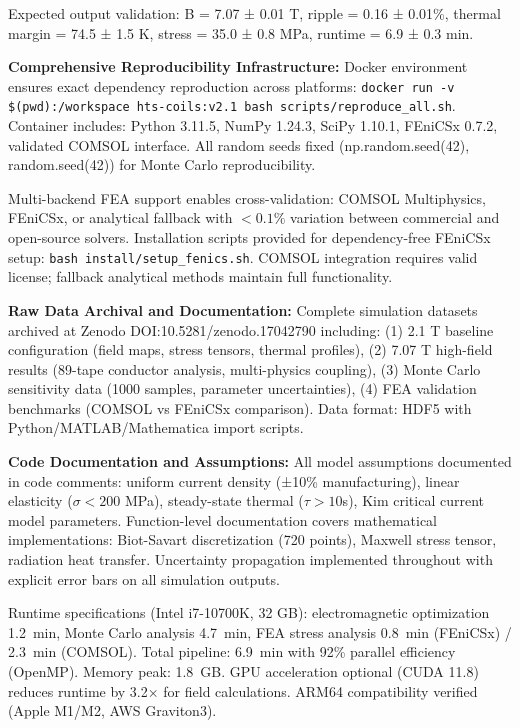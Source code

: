 \documentclass[10pt,twocolumn]{article}
\begin{document}
Expected output validation: B = 7.07 ± 0.01 T, ripple = 0.16 ± 0.01\%, thermal margin = 74.5 ± 1.5 K, stress = 35.0 ± 0.8 MPa, runtime = 6.9 ± 0.3 min.

\textbf{Comprehensive Reproducibility Infrastructure:} Docker environment ensures exact dependency reproduction across platforms: \texttt{docker run -v \$(pwd):/workspace hts-coils:v2.1 bash scripts/reproduce\_all.sh}. Container includes: Python 3.11.5, NumPy 1.24.3, SciPy 1.10.1, FEniCSx 0.7.2, validated COMSOL interface. All random seeds fixed (np.random.seed(42), random.seed(42)) for Monte Carlo reproducibility.

Multi-backend FEA support enables cross-validation: COMSOL Multiphysics, FEniCSx, or analytical fallback with $<0.1\%$ variation between commercial and open-source solvers. Installation scripts provided for dependency-free FEniCSx setup: \texttt{bash install/setup\_fenics.sh}. COMSOL integration requires valid license; fallback analytical methods maintain full functionality.

\textbf{Raw Data Archival and Documentation:} Complete simulation datasets archived at Zenodo DOI:10.5281/zenodo.17042790 including: (1) 2.1 T baseline configuration (field maps, stress tensors, thermal profiles), (2) 7.07 T high-field results (89-tape conductor analysis, multi-physics coupling), (3) Monte Carlo sensitivity data (1000 samples, parameter uncertainties), (4) FEA validation benchmarks (COMSOL vs FEniCSx comparison). Data format: HDF5 with Python/MATLAB/Mathematica import scripts.

\textbf{Code Documentation and Assumptions:} All model assumptions documented in code comments: uniform current density (±10\% manufacturing), linear elasticity ($\sigma<200$ MPa), steady-state thermal ($\tau>10$s), Kim critical current model parameters. Function-level documentation covers mathematical implementations: Biot-Savart discretization (720 points), Maxwell stress tensor, radiation heat transfer. Uncertainty propagation implemented throughout with explicit error bars on all simulation outputs.

Runtime specifications (Intel i7-10700K, 32 GB): electromagnetic optimization 1.2~min, Monte Carlo analysis 4.7~min, FEA stress analysis 0.8~min (FEniCSx) / 2.3~min (COMSOL). Total pipeline: 6.9~min with 92\% parallel efficiency (OpenMP). Memory peak: 1.8~GB. GPU acceleration optional (CUDA 11.8) reduces runtime by 3.2× for field calculations. ARM64 compatibility verified (Apple M1/M2, AWS Graviton3).
\end{document}
